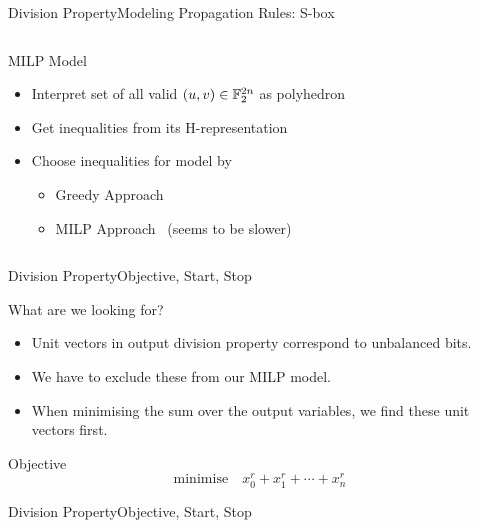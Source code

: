 \begin{frame}{Division Property}{Modeling Propagation Rules: S-box}
\begin{columns}
\begin{column}{0.575\textwidth}
\begin{block}{MILP Model}
\begin{itemize}
                \item Interpret set of all valid $(u, v) \in \mathbb{F}_2^{2n}$ as polyhedron
                \item Get inequalities from its H-representation
                \item Choose inequalities for model by
                    \begin{itemize}
                        \item Greedy Approach~\cite{AC:SHWQMS14}
                        \item MILP Approach~\cite{SecITC:SasTod17} (seems to be slower)
                    \end{itemize}
            \end{itemize}
            \end{block}
        \end{column}
    \end{columns}
\end{frame}


\begin{frame}{Division Property}{Objective, Start, Stop}
    \begin{block}{What are we looking for?}
        \begin{itemize}
            \item Unit vectors in output division property correspond to unbalanced bits.
            \item We have to exclude these from our MILP model.
            \item When minimising the sum over the output variables, we find these unit vectors first.
        \end{itemize}
    \end{block}
    \begin{block}{Objective}
        \begin{equation*}
            \mathrm{minimise} \quad x_0^r + x_1^r + \cdots + x_n^r
        \end{equation*}
    \end{block}
\end{frame}

\begin{frame}{Division Property}{Objective, Start, Stop}
\end{frame}

